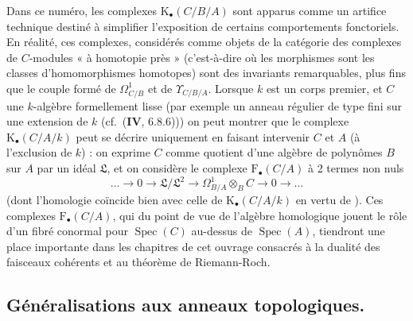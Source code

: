 \begin{remark}[20.6.26]
\label{0.20.6.26-fr}
Dans ce numéro, les complexes $\mathrm{K}_\bullet(C/B/A)$ sont apparus comme
un artifice technique destiné à simplifier l'exposition de certains
comportements fonctoriels. En réalité, ces complexes, considérés comme objets
de la catégorie des
complexes de $C$-modules « à homotopie près » (c'est-à-dire où les morphismes
sont les classes d'homomorphismes homotopes) sont des invariants remarquables,
plus fins que le couple formé de $\Omega^1_{C/B}$ et de
$\Upsilon_{C/B/A}$. Lorsque $k$ est un corps premier, et $C$ une $k$-algèbre
formellement lisse (par exemple un anneau régulier de type fini sur une
extension de $k$ (cf.\ ($\mathbf{IV}$, 6.8.6))) on peut montrer que le
complexe $\mathrm{K}_\bullet(C/A/k)$ peut se décrire uniquement en faisant
intervenir $C$ et $A$ (à l'exclusion de $k$) : on exprime $C$ comme quotient
d'une algèbre de polynômes $B$ sur $A$ par un idéal $\mathfrak{L}$, et on
considère le complexe $\mathrm{F}_\bullet(C/A)$ à 2 termes non nuls
\[
  \ldots\to0\to\mathfrak{L}/\mathfrak{L}^2\to
  \Omega^1_{B/A}\otimes_B C\to0\to\ldots
\]
(dont l'homologie coïncide bien avec celle de
$\mathrm{K}_\bullet(C/A/k)$ en vertu de ). Ces
complexes $\mathrm{F}_\bullet(C/A)$, qui du point de vue de l'algèbre
homologique jouent le rôle d'un fibré conormal pour $\operatorname{Spec}(C)$
au-dessus de $\operatorname{Spec}(A)$, tiendront une place importante dans
les chapitres de cet ouvrage consacrés à la dualité des faisceaux cohérents et
au théorème de Riemann-Roch.
\end{remark}

\subsection{Généralisations aux anneaux topologiques.}
\label{subsection:0.20.7-fr}

